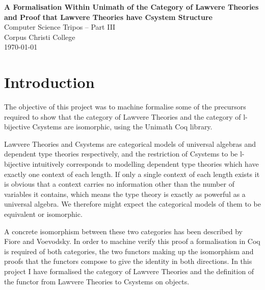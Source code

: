 \documentclass[12pt,a4paper,twoside,openright]{report}
\begin{document}
\pagestyle{empty}
\begin{titlepage}
    \begin{center}
        \vspace*{60mm}
        \Huge \textbf{A Formalisation Within Unimath of the Category of Lawvere
        Theories and Proof that Lawvere Theories have Csystem Structure} \\
        \vspace{5mm}
        Computer Science Tripos -- Part III \\
        \vspace{5mm}
        Corpus Christi College \\
        \vspace{5mm}
        \today
    \end{center}
\end{titlepage}
\tableofcontents
\pagestyle{plain}
\listoffigures

\pagestyle{headings}
\chapter{Introduction}
The objective of this project was to machine formalise some of the precursors
required to show that the category of Lawvere Theories and the category of
l-bijective Csystems are isomorphic, using the Unimath Coq library. 

Lawvere Theories and Csystems are categorical models of
universal algebras and dependent type theories respectively, and the restriction
of Csystems to be l-bijective intuitively corresponds to modelling dependent
type theories which have exactly one context of each length. If only a single
context of each length exists it is obvious that a context carries no
information other than the number of variables it contains, which means the type
theory is exactly as powerful as a universal algebra. We therefore might expect
the categorical models of them to be equivalent or isomorphic.

A concrete isomorphism between these two categories has been described by Fiore
and Voevodsky. In order to machine verify this proof a formalisation in Coq is
required of both categories, the two functors making up the isomorphism and
proofs that the functors compose to give the identity in both directions. In
this project I have formalised the category of Lawvere Theories and the
definition of the functor from Lawvere Theories to Csystems on objects.
\end{document}
